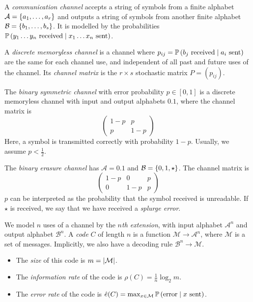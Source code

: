 \begin{definition}
    A \emph{communication channel} accepts a string of symbols from a finite alphabet \( \mathcal A = \qty{a_1, \dots, a_r} \) and outputs a string of symbols from another finite alphabet \( \mathcal B = \qty{b_1, \dots, b_s} \).
    It is modelled by the probabilities \( \mathbb{P}\left({y_1 \dots y_n \text{ received} \mid x_1 \dots x_n \text{ sent}}\right) \).
\end{definition}
\begin{definition}
    A \emph{discrete memoryless channel} is a channel where \( p_{ij} = \mathbb{P}\left({b_j \text{ received} \mid a_i \text{ sent}}\right) \) are the same for each channel use, and independent of all past and future uses of the channel.
    Its \emph{channel matrix} is the \( r \times s \) stochastic matrix \( P = (p_{ij}) \).
\end{definition}
\begin{example}
    The \emph{binary symmetric channel} with error probability \( p \in [0,1] \) is a discrete memoryless channel with input and output alphabets \( \qty{0, 1} \), where the channel matrix is
    \[ \begin{pmatrix}
            1-p & p \\
            p & 1-p
    \end{pmatrix} \]
    Here, a symbol is transmitted correctly with probability \( 1 - p \).
    Usually, we assume \( p < \frac{1}{2} \).
\end{example}
\begin{example}
    The \emph{binary erasure channel} has \( \mathcal A = \qty{0, 1} \) and \( \mathcal B = \qty{0, 1, \star} \).
    The channel matrix is
    \[ \begin{pmatrix}
        1-p & 0 & p \\
        0 & 1-p & p
    \end{pmatrix} \]
    \( p \) can be interpreted as the probability that the symbol received is unreadable.
    If \( \star \) is received, we say that we have received a \emph{splurge error}.
\end{example}
\begin{definition}
    We model \( n \) uses of a channel by the \emph{\( n \)th extension}, with input alphabet \( \mathcal A^n \) and output alphabet \( \mathcal B^n \).
    A \emph{code} \( C \) of length \( n \) is a function \( \mathcal M \to \mathcal A^n \), where \( \mathcal M \) is a set of messages.
    Implicitly, we also have a decoding rule \( \mathcal B^n \to \mathcal M \).
    \begin{itemize}
        \item The \emph{size} of this code is \( m = \abs{\mathcal M} \).
        \item The \emph{information rate} of the code is \( \rho(C) = \frac{1}{n} \log_2 m \).
        \item The \emph{error rate} of the code is \( \hat e(C) = \max_{x \in \mathcal M} \mathbb{P}\left({\text{error} \mid x \text{ sent}}\right) \).
    \end{itemize}
\end{definition}
